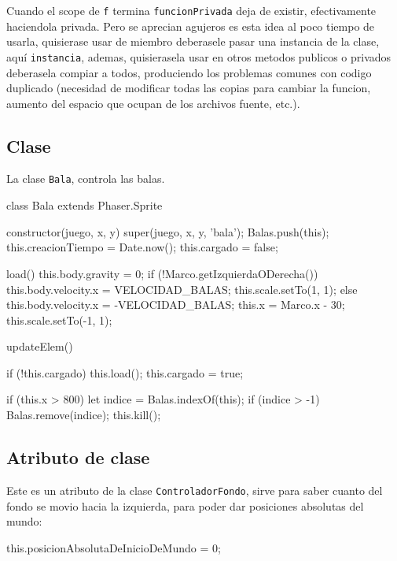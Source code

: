 \documentclass{article}
\newcommand{\insertverbbox}{{\addvbuffer[6pt 3pt]{\theverbbox}\par}}
\begin{document}
   	Cuando el scope de \verb|f| termina \verb|funcionPrivada| deja de existir, efectivamente haciendola privada. Pero se aprecian agujeros es esta idea al poco tiempo de usarla, quisierase usar de miembro deberasele pasar una instancia de la clase, aquí \verb|instancia|, ademas, quisierasela usar en otros metodos publicos o privados deberasela compiar a todos, produciendo los problemas comunes con codigo duplicado (necesidad de modificar todas las copias para cambiar la funcion, aumento del espacio que ocupan de los archivos fuente, etc.).
    
   	\subsection*{Clase}
   	
   	La clase \verb|Bala|, controla las balas.
   	
    \begin{verbbox}
class Bala extends Phaser.Sprite {
    constructor(juego, x, y) {
        super(juego, x, y, 'bala');
        Balas.push(this);
        this.creacionTiempo = Date.now();
        this.cargado = false;
    }
    
    load() {
        this.body.gravity = 0;
        if (!Marco.getIzquierdaODerecha()) {
            this.body.velocity.x = VELOCIDAD_BALAS;
            this.scale.setTo(1, 1);
        } else {
            this.body.velocity.x = -VELOCIDAD_BALAS;
            this.x = Marco.x - 30;
            this.scale.setTo(-1, 1);
        }
    }
    
    updateElem() {
        if (!this.cargado) {
            this.load();
            this.cargado = true;
        }
        
        if (this.x > 800) {
            let indice = Balas.indexOf(this);
            if (indice > -1) {
                Balas.remove(indice);
            }
            this.kill();
        }
    }
}
   	\end{verbbox}
   	\insertverbbox  
   	
   	\subsection*{Atributo de clase}
   	Este es un atributo de la clase \verb|ControladorFondo|, sirve para saber cuanto del fondo se movio hacia la izquierda, para poder dar posiciones absolutas del mundo:
   	
   	\begin{verbbox}
		this.posicionAbsolutaDeInicioDeMundo = 0;
   	\end{verbbox}
   	\insertverbbox
   	
\end{document}
